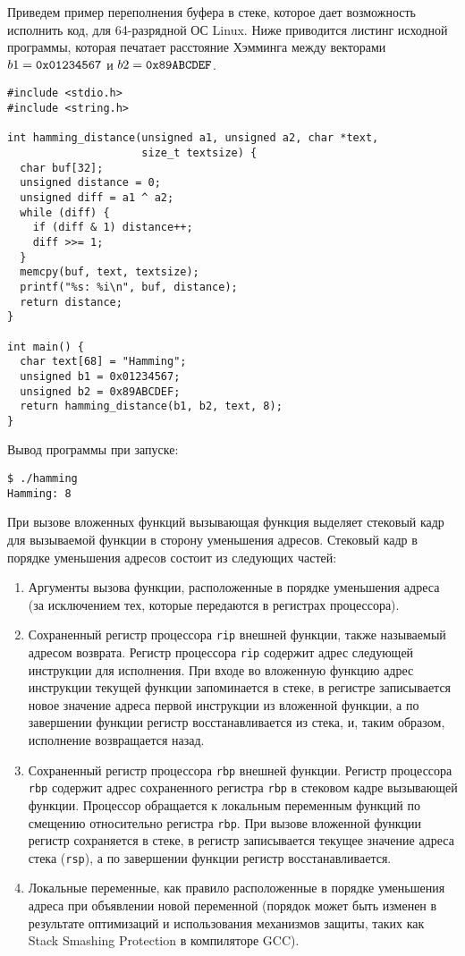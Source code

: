 Приведем пример переполнения буфера в стеке, которое дает возможность исполнить код, для 64-разрядной ОС Linux. Ниже приводится листинг исходной программы, которая печатает расстояние Хэмминга между векторами $b1 = \text{\texttt{0x01234567}}$ и $b2 = \text{\texttt{0x89ABCDEF}}$.

\begin{verbatim}
#include <stdio.h>
#include <string.h>

int hamming_distance(unsigned a1, unsigned a2, char *text,
                     size_t textsize) {
  char buf[32];
  unsigned distance = 0;
  unsigned diff = a1 ^ a2;
  while (diff) {
    if (diff & 1) distance++;
    diff >>= 1;
  }
  memcpy(buf, text, textsize);
  printf("%s: %i\n", buf, distance);
  return distance;
}

int main() {
  char text[68] = "Hamming";
  unsigned b1 = 0x01234567;
  unsigned b2 = 0x89ABCDEF;
  return hamming_distance(b1, b2, text, 8);
}
\end{verbatim}

Вывод программы при запуске:
\begin{verbatim}
$ ./hamming
Hamming: 8
\end{verbatim}

При вызове вложенных функций вызывающая функция выделяет стековый кадр для вызываемой функции в сторону уменьшения адресов. Стековый кадр в порядке уменьшения адресов состоит из следующих частей:
\begin{enumerate}
    \item Аргументы вызова функции, расположенные в порядке уменьшения адреса (за исключением тех, которые передаются в регистрах процессора).
    \item Сохраненный регистр процессора \texttt{rip} внешней функции, также называемый адресом возврата. Регистр процессора \texttt{rip} содержит адрес следующей инструкции для исполнения. При входе во вложенную функцию адрес инструкции текущей функции запоминается в стеке, в регистре записывается новое значение адреса первой инструкции из вложенной функции, а по завершении функции регистр восстанавливается из стека, и, таким образом, исполнение возвращается назад.
    \item Сохраненный регистр процессора \texttt{rbp} внешней функции. Регистр процессора \texttt{rbp} содержит адрес сохраненного регистра \texttt{rbp} в стековом кадре вызывающей функции. Процессор обращается к локальным переменным функций по смещению относительно регистра \texttt{rbp}. При вызове вложенной функции регистр сохраняется в стеке, в регистр записывается текущее значение адреса стека (\texttt{rsp}), а по завершении функции регистр восстанавливается.
    \item Локальные переменные, как правило расположенные в порядке уменьшения адреса при объявлении новой переменной (порядок может быть изменен в результате оптимизаций и использования механизмов защиты, таких как Stack Smashing Protection в компиляторе GCC).
\end{enumerate}

